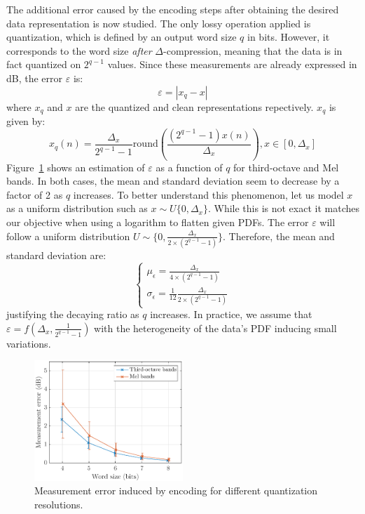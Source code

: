 \documentclass[sensors,article,submit,moreauthors,pdftex,10pt,a4paper]{mdpi}
\begin{document}
The additional error caused by the encoding steps after obtaining the desired data representation is now studied. The only lossy operation applied is quantization, which is defined by an output word size $q$ in bits. However, it corresponds to the word size \textit{after} $\Delta$-compression, meaning that the data is in fact quantized on $2^{q-1}$ values. Since these measurements are already expressed in dB, the error $\varepsilon$ is:
\begin{equation*}
	\varepsilon = |x_q-x|
\end{equation*}
where $x_q$ and $x$ are the quantized and clean representations repectively. $x_q$ is given by:
\begin{equation*}
x_q(n) = \frac{\Delta_x}{2^{q-1}-1}\textrm{round}\left(\frac{(2^{q-1}-1)x(n)}{\Delta_x}\right), x\in \left[0, \Delta_x\right]
\end{equation*}
Figure~\ref{fig:error_q} shows an estimation of $\varepsilon$ as a function of $q$ for third-octave and Mel bands. In both cases, the mean and standard deviation seem to decrease by a factor of 2 as $q$ increases. To better understand this phenomenon, let us model $x$ as a uniform distribution such as $x\sim \textit{U}\{0, \Delta_x\}$. While this is not exact it matches our objective when using a logarithm to flatten given PDFs. The error $\varepsilon$ will follow a uniform distribution $U\sim \{0, \frac{\Delta_x}{2\times (2^{q-1}-1)}\}$. Therefore, the mean and standard deviation are:
\[
\begin{cases}
	\mu_\epsilon = \frac{\Delta_x}{4\times (2^{q-1}-1)}\\
	\sigma_\epsilon = \frac{1}{12}\frac{\Delta_x}{2\times (2^{q-1}-1)}
\end{cases}
\]
justifying the decaying ratio as $q$ increases. In practice, we assume that $\varepsilon = f(\Delta_x, \frac{1}{2^{q-1}-1})$ with the heterogeneity of the data's PDF inducing small variations.

\begin{figure}[htbp]
	\centering
		\includegraphics[width=0.5\textwidth]{figures/error_qall.eps}
	\caption{Measurement error induced by encoding for different quantization resolutions.}
	\label{fig:error_q}
\end{figure}
\end{document}

